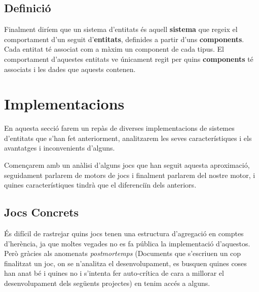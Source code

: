 \subsection{Definició}

Finalment diríem que un sistema d'entitats és aquell {\bf sistema} que regeix el comportament d'un seguit d'{\bf entitats}, definides a partir d'uns {\bf components}. Cada entitat té associat com a màxim un component de cada tipus. El comportament d'aquestes entitats ve únicament regit per quins {\bf components} té associats i les dades que aquests contenen.

\section{Implementacions}

En aquesta secció farem un repàs de diverses implementacions de sistemes d'entitats que s'han fet anteriorment, analitzarem les seves característiques i els avantatges i inconvenients d'alguns.

Començarem amb un anàlisi d'alguns jocs que han seguit aquesta aproximació, seguidament parlarem de motors de jocs i finalment parlarem del nostre motor, i quines característiques tindrà que el diferenciïn dels anteriors.

\subsection{Jocs Concrets}

És difícil de rastrejar quins jocs tenen una estructura d'agregació en comptes d'herència, ja que moltes vegades no es fa pública la implementació d'aquestos. Però gràcies als anomenats {\em postmortemps} (Documents que s'escriuen un cop finalitzat un joc, on se n'analitza el desenvolupament, es busquen quines coses han anat bé i quines no i s'intenta fer auto-crítica de cara a millorar el desenvolupament dels següents projectes) en tenim accés a alguns.

